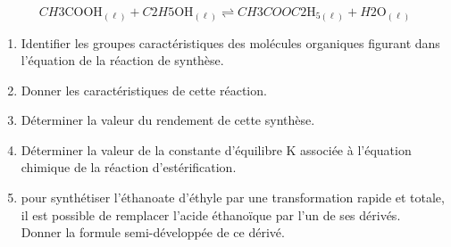 $$
CH3 \mathrm{COOH}_{(\ell)}+C2 H5 \mathrm{OH}_{(\ell)} \rightleftharpoons CH3 COOC2 \mathrm{H}_{5(\ell)}+H2 \mathrm{O}_{(\ell)}
$$

\begin{enumerate}
  \item Identifier les groupes caractéristiques des molécules organiques figurant dans l'équation de la réaction de synthèse.
  \item Donner les caractéristiques de cette réaction.
  \item Déterminer la valeur du rendement de cette synthèse.
  \item Déterminer la valeur de la constante d'équilibre K associée à l'équation chimique de la réaction d'estérification.
  \item pour synthétiser l'éthanoate d'éthyle par une transformation rapide et totale, il est possible de remplacer l'acide éthanoïque par l'un de ses dérivés.\\
Donner la formule semi-développée de ce dérivé.
\end{enumerate}

